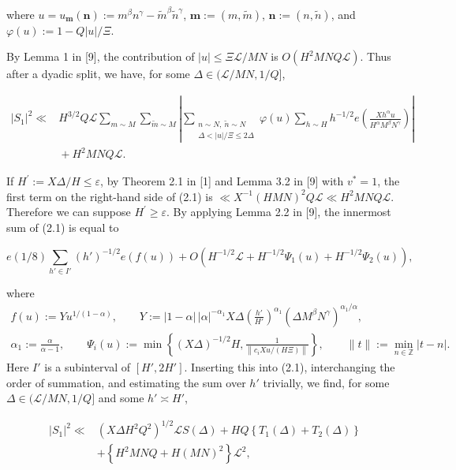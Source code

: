 \documentclass[10pt]{article}
\begin{document}
where $u=u_{\mathbf{m}}(\mathbf{n}):=m^{\beta}n^{\gamma}-\tilde{m}^{\beta}\tilde{n}^{\gamma}$, $\mathbf{m}:=(m,\tilde{m})$, $\mathbf{n}:=(n,\tilde{n})$, and $\varphi(u):=1-Q|u|/\Xi$.

By Lemma 1 in [9], the contribution of $|u| \leqslant \Xi \mathscr{L} / M N$ is $O\left(H^{2} M N Q \mathscr{L}\right)$. Thus after a dyadic split, we have, for some $\Delta \in(\mathscr{L} / M N, 1 / Q]$,


\begin{align*}
|S_{1}|^{2} \ll{}& H^{3/2}Q\mathscr{L}
\sum_{m\sim M}\sum_{\tilde m\sim M}
\left|\sum_{\substack{n\sim N,\ \tilde n\sim N\\
\Delta<|u|/\Xi\leqslant 2\Delta}}
\varphi(u)\sum_{h\sim H}h^{-1/2}
 e\left(\frac{Xh^{\alpha}u}{H^{\alpha}M^{\beta}N^{\gamma}}\right)\right| \\
&{}+H^{2}MNQ\mathscr{L}. \tag{2.1}
\end{align*}


If $H^{\prime}:=X \Delta / H \leqslant \varepsilon$, by Theorem 2.1 in [1] and Lemma 3.2 in [9] with $v^{*}=1$, the first term on the right-hand side of (2.1) is $\ll X^{-1}(H M N)^{2} Q \mathscr{L} \ll H^{2} M N Q \mathscr{L}$. Therefore we can suppose $H^{\prime} \geqslant \varepsilon$. By applying Lemma 2.2 in [9], the innermost sum of (2.1) is equal to

$$
e(1/8)\sum_{h'\in I'}(h')^{-1/2}e(f(u))+O\left(H^{-1 / 2} \mathscr{L}+H^{-1 / 2} \Psi_{1}(u)+H^{-1 / 2} \Psi_{2}(u)\right),
$$

where
\[
\begin{gathered}
f(u):=Yu^{1/(1-\alpha)},\qquad
Y:=|1-\alpha|\,|\alpha|^{-\alpha_1}X\Delta
\left(\frac{h'}{H'}\right)^{\alpha_1}
\left(\Delta M^\beta N^\gamma\right)^{\alpha_1/\alpha},\\
\alpha_1:=\frac{\alpha}{\alpha-1},\qquad
\Psi_i(u):=\min\left\{(X\Delta)^{-1/2}H,
\frac{1}{\left\|c_iXu/(H\Xi)\right\|}\right\},\qquad
\|t\|:=\min_{n\in\mathbb Z}|t-n|.
\end{gathered}
\]
Here $I'$ is a subinterval of $[H',2H']$. Inserting this into (2.1), interchanging the order of summation, and estimating the sum over $h'$ trivially, we find, for some $\Delta\in(\mathscr{L}/MN,1/Q]$ and some $h'\asymp H'$,


\begin{align*}
|S_{1}|^{2} \ll & \left(X \Delta H^{2} Q^{2}\right)^{1 / 2} \mathscr{L} S(\Delta)+H Q\left\{T_{1}(\Delta)+T_{2}(\Delta)\right\} \\
& +\left\{H^{2} M N Q+H(M N)^{2}\right\} \mathscr{L}^{2}, \tag{2.2}
\end{align*}
\end{document}
